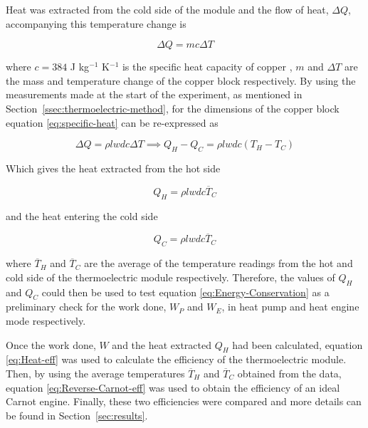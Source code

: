 \documentclass{article}
\newcommand{\secref}[2][Section~]{#1\ref{#2}}
\begin{document}
\vspace{2mm}  
\noindent
Heat was extracted from the cold side of the module and the flow of heat, $\Delta Q$, accompanying this temperature change is

\begin{equation}
\label{eq:specific-heat}
\Delta Q = mc\Delta T
\end{equation}

\vspace{2mm}  
\noindent
where $c = 384$ J kg$^{-1}$ K$^{-1}$ is the specific heat capacity of copper \cite{Paper02}, $m$ and $\Delta T$ are the mass and temperature change of the copper block respectively. By using the measurements made at the start of the experiment, as mentioned in \secref{ssec:thermoelectric-method}, for the dimensions of the copper block equation \eqref{eq:specific-heat} can be re-expressed as 

\begin{equation}
\label{eq:specific-heat1}
\Delta Q = \rho lwdc\Delta T \implies Q_H - Q_C = \rho lwdc(T_H - T_C)
\end{equation}

\vspace{2mm}  
\noindent
Which gives the heat extracted from the hot side

\begin{equation}
\label{eq:heat-extract}
Q_H = \rho lwdc \overline T_C
\end{equation}

\vspace{2mm}  
\noindent
and the heat entering the cold side

\begin{equation}
\label{eq:heat-enter}
Q_C = \rho lwdc\overline T_C
\end{equation}

\vspace{2mm}  
\noindent
where $\overline T_H$ and $\overline T_C$ are the average of the temperature readings from the hot and cold side of the thermoelectric module respectively. Therefore, the values of $Q_H$ and $Q_C$ could then be used to test equation \eqref{eq:Energy-Conservation} as a preliminary check for the work done, $W_P$ and $W_E$, in heat pump and heat engine mode respectively.

\vspace{2mm}  
\noindent
Once the work done, $W$ and the heat extracted $Q_H$ had been calculated, equation \eqref{eq:Heat-eff} was used to calculate the efficiency of the thermoelectric module. Then, by using the average temperatures $\overline T_H$ and $\overline T_C$ obtained from the data, equation \eqref{eq:Reverse-Carnot-eff} was used to obtain the efficiency of an ideal Carnot engine. Finally, these two efficiencies were compared and more details can be found in \secref{sec:results}.
\end{document}
